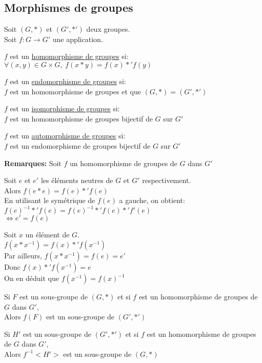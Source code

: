 \documentclass[12pt,twoside,a4paper]{article}
\begin{document}
		\subsection{Morphismes de groupes}
			Soit $(G,*)$ et $(G',*')$ deux groupes.\\
			Soit $f:G\rightarrow G'$ une application.
			\begin{defi}
				\begin{liste}
					\item $f$ est un \underline{homomorphisme de groupes} si:\\
					$\forall(x,y)\in G\times G,\ f(x*y)=f(x)*'f(y)$
					\item $f$ est un \underline{endomorphisme de groupes} si:\\
					$f$ est un homomorphisme de groupes et que $(G,*)=(G',*')$
					\item $f$ est un \underline{isomorphisme de groupes} si:\\
					$f$ est un homomorphisme de groupes bijectif de $G$ sur $G'$
					\item $f$ est un \underline{automorphisme de groupes} si:\\
					$f$ est un endomorphisme de groupes bijectif de $G$ sur $G'$
				\end{liste}
			\end{defi}
			\begin{flushleft}
				\textbf{Remarques:} Soit $f$ un homomorphisme de groupes de $G$ dans $G'$\\
				\begin{liste}
					\item Soit $e$ et $e'$ les \'el\'ements neutres de $G$ et $G'$ respectivement.\\
						Alors $f(e*e)=f(e)*'f(e)$\\
						En utilisant le sym\'etrique de $f(e)$ a gauche, on obtient:\\
						$f(e)^{-1}*'f(e)=f(e)^{-1}*'f(e)*'f'(e)$\\
						$\iff e'=f(e)$
					\item Soit $x$ un \'el\'ement de $G$.\\
						$f(x*x^{-1})=f(x)*'f(x^{-1})$\\
						Par ailleurs, $f(x*x^{-1})=f(e)=e'$\\
						Donc $f(x)*'f(x^{-1})=e$\\
						On en d\'eduit que $f(x^{-1})=f(x)^{-1}$
				\end{liste}
			\end{flushleft}
			\begin{prop}
				\begin{liste}
					\item Si $F$ est un sous-groupe de $(G,*)$ et si $f$ est un homomorphisme de groupes de $G$ dans $G'$,\\
					Alors $f(F)$ est un sous-groupe de $(G',*')$
					\item Si $H'$ est un sous-groupe de $(G',*')$ et si $f$ est un homomorphisme de groupes de $G$ dans $G'$,\\
					Alors $f^{-1}<H'>$ est un sous-groupe de $(G,*)$
				\end{liste}
			\end{prop}
\end{document}
